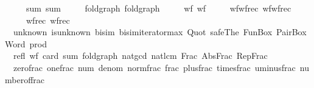 \begin{isabellebody}
\ \ \ \ \ {\isacharparenleft}{\kern0pt}\isactrlconstUNDERSCOREname {\isasymopen}sum{\isasymclose}{\isacharcomma}{\kern0pt}\ \isactrlconstUNDERSCOREname {\isasymopen}sum{\isacharprime}{\kern0pt}{\isasymclose}{\isacharparenright}{\kern0pt}{\isacharcomma}{\kern0pt}\isanewline
\ \ \ \ \ {\isacharparenleft}{\kern0pt}\isactrlconstUNDERSCOREname {\isasymopen}fold{\isacharunderscore}{\kern0pt}graph{\isasymclose}{\isacharcomma}{\kern0pt}\ \isactrlconstUNDERSCOREname {\isasymopen}fold{\isacharunderscore}{\kern0pt}graph{\isacharprime}{\kern0pt}{\isasymclose}{\isacharparenright}{\kern0pt}{\isacharcomma}{\kern0pt}\isanewline
\ \ \ \ \ {\isacharparenleft}{\kern0pt}\isactrlconstUNDERSCOREname {\isasymopen}wf{\isasymclose}{\isacharcomma}{\kern0pt}\ \isactrlconstUNDERSCOREname {\isasymopen}wf{\isacharprime}{\kern0pt}{\isasymclose}{\isacharparenright}{\kern0pt}{\isacharcomma}{\kern0pt}\isanewline
\ \ \ \ \ {\isacharparenleft}{\kern0pt}\isactrlconstUNDERSCOREname {\isasymopen}wf{\isacharunderscore}{\kern0pt}wfrec{\isasymclose}{\isacharcomma}{\kern0pt}\ \isactrlconstUNDERSCOREname {\isasymopen}wf{\isacharunderscore}{\kern0pt}wfrec{\isacharprime}{\kern0pt}{\isasymclose}{\isacharparenright}{\kern0pt}{\isacharcomma}{\kern0pt}\isanewline
\ \ \ \ \ {\isacharparenleft}{\kern0pt}\isactrlconstUNDERSCOREname {\isasymopen}wfrec{\isasymclose}{\isacharcomma}{\kern0pt}\ \isactrlconstUNDERSCOREname {\isasymopen}wfrec{\isacharprime}{\kern0pt}{\isasymclose}{\isacharparenright}{\kern0pt}{\isacharbrackright}{\kern0pt}\isanewline
{\isacartoucheclose}%
\endisatagML
{\isafoldML}%
%
\isadelimML
\isanewline
%
\endisadelimML
\isanewline
{}\isamarkupfalse%
\ {\isacharparenleft}{\kern0pt}\ unknown\ is{\isacharunderscore}{\kern0pt}unknown\ bisim\ bisim{\isacharunderscore}{\kern0pt}iterator{\isacharunderscore}{\kern0pt}max\ Quot\ safe{\isacharunderscore}{\kern0pt}The\ FunBox\ PairBox\ Word\ prod\isanewline
\ \ refl{\isacharprime}{\kern0pt}\ wf{\isacharprime}{\kern0pt}\ card{\isacharprime}{\kern0pt}\ sum{\isacharprime}{\kern0pt}\ fold{\isacharunderscore}{\kern0pt}graph{\isacharprime}{\kern0pt}\ nat{\isacharunderscore}{\kern0pt}gcd\ nat{\isacharunderscore}{\kern0pt}lcm\ Frac\ Abs{\isacharunderscore}{\kern0pt}Frac\ Rep{\isacharunderscore}{\kern0pt}Frac\isanewline
\ \ zero{\isacharunderscore}{\kern0pt}frac\ one{\isacharunderscore}{\kern0pt}frac\ num\ denom\ norm{\isacharunderscore}{\kern0pt}frac\ frac\ plus{\isacharunderscore}{\kern0pt}frac\ times{\isacharunderscore}{\kern0pt}frac\ uminus{\isacharunderscore}{\kern0pt}frac\ number{\isacharunderscore}{\kern0pt}of{\isacharunderscore}{\kern0pt}frac\isanewline

\end{isabellebody}
